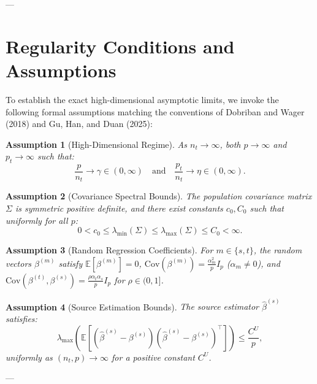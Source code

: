 \documentclass{article}
\newtheorem{assumption}{Assumption}
\begin{document}
---

\section{Regularity Conditions and Assumptions}
To establish the exact high-dimensional asymptotic limits, we invoke the following formal assumptions matching the conventions of Dobriban and Wager (2018) and Gu, Han, and Duan (2025):

\begin{assumption}[High-Dimensional Regime]\label{assump:dimensions}
As $n_t \to \infty$, both $p \to \infty$ and $p_t \to \infty$ such that:
\begin{equation}
\frac{p}{n_t} \to \gamma \in (0, \infty) \quad \text{and} \quad \frac{p_t}{n_t} \to \eta \in (0, \infty).
\end{equation}
\end{assumption}

\begin{assumption}[Covariance Spectral Bounds]\label{assump:spectral}
The population covariance matrix $\Sigma$ is symmetric positive definite, and there exist constants $c_0, C_0$ such that uniformly for all $p$:
\begin{equation}
0 < c_0 \le \lambda_{\min}(\Sigma) \le \lambda_{\max}(\Sigma) \le C_0 < \infty.
\end{equation}
\end{assumption}

\begin{assumption}[Random Regression Coefficients]\label{assump:coefficients}
For $m \in \{s, t\}$, the random vectors $\beta^{(m)}$ satisfy $\mathbb{E}[\beta^{(m)}] = 0$, $\mathrm{Cov}(\beta^{(m)}) = \frac{\alpha_m^2}{p} I_p$ ($\alpha_m \neq 0$), and $\mathrm{Cov}(\beta^{(t)}, \beta^{(s)}) = \frac{\rho \alpha_t \alpha_s}{p} I_p$ for $\rho \in (0, 1]$.
\end{assumption}

\begin{assumption}[Source Estimation Bounds]\label{assump:source_error}
The source estimator $\hat\beta^{(s)}$ satisfies:
\begin{equation}
\lambda_{\max}\left( \mathbb{E}\left[ (\hat\beta^{(s)} - \beta^{(s)})(\hat\beta^{(s)} - \beta^{(s)})^\top \right] \right) \le \frac{C^U}{p},
\end{equation}
uniformly as $(n_t, p) \to \infty$ for a positive constant $C^U$.
\end{assumption}

---
\end{document}
